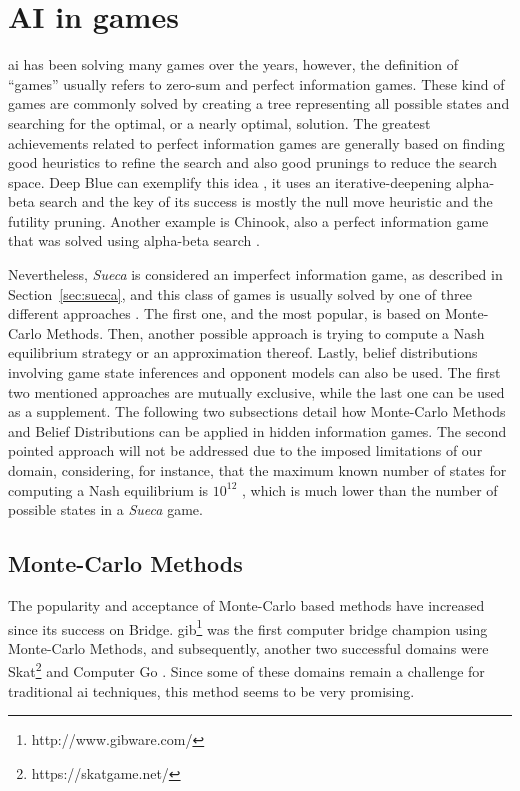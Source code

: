 \section{AI in games}

\ac{ai} has been solving many games over the years, however, the definition of ``games'' usually refers to zero-sum and perfect information games.
These kind of games are commonly solved by creating a tree representing all possible states and searching for the optimal, or a nearly optimal, solution.
The greatest achievements related to perfect information games are generally based on finding good heuristics to refine the search and also good prunings to reduce the search space.
Deep Blue can exemplify this idea \cite{Campbell2002}, it uses an iterative-deepening alpha-beta search and the key of its success is mostly the null move heuristic and the futility pruning.
Another example is Chinook, also a perfect information game that was solved using alpha-beta search \cite{Schaeffer1996}.

Nevertheless, \emph{Sueca} is considered an imperfect information game, as described in Section~\ref{sec:sueca}, and this class of games is usually solved by one of three different approaches \cite{Cowling2012}.
The first one, and the most popular, is based on Monte-Carlo Methods.
Then, another possible approach is trying to compute a Nash equilibrium strategy or an approximation thereof.
Lastly, belief distributions involving game state inferences and opponent models can also be used.
The first two mentioned approaches are mutually exclusive, while the last one can be used as a supplement.
The following two subsections detail how Monte-Carlo Methods and Belief Distributions can be applied in hidden information games.
The second pointed approach will not be addressed due to the imposed limitations of our domain, considering, for instance, that the maximum known number of states for computing a Nash equilibrium is $10^{12}$ \cite{Zinkevich}, which is much lower than the number of possible states in a \emph{Sueca} game.




\subsection{Monte-Carlo Methods}

The popularity and acceptance of Monte-Carlo based methods have increased since its success on Bridge.
\ac{gib}\footnote{http://www.gibware.com/} was the first computer bridge champion using Monte-Carlo Methods, and subsequently, another two successful domains were Skat\footnote{https://skatgame.net/} and Computer Go \cite{Gelly2011}.
Since some of these domains remain a challenge for traditional \ac{ai} techniques, this method seems to be very promising.


